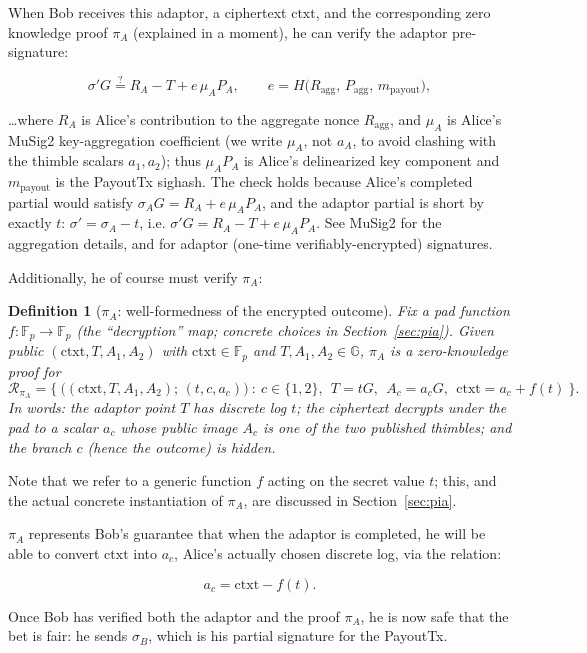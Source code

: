 \documentclass[11pt]{article}
\newtheorem{definition}{Definition}
\begin{document}
When Bob receives this adaptor, a ciphertext $\textrm{ctxt}$, and the corresponding zero knowledge proof $\pi_A$ (explained in a moment), he can verify the adaptor pre-signature:

\[\sigma' G \stackrel{?}{=} R_{A} - T + e\,\mu_A P_A,\qquad e = H\big(R_{\mathrm{agg}},\,P_{\mathrm{agg}},\,m_{\mathrm{payout}}\big),\]

\ldots where $R_{A}$ is Alice's contribution to the aggregate nonce $R_{\mathrm{agg}}$, and $\mu_A$ is Alice's MuSig2 key-aggregation coefficient (we write $\mu_A$, not $a_A$, to avoid clashing with the thimble scalars $a_1,a_2$); thus $\mu_A P_A$ is Alice's delinearized key component and $m_{\mathrm{payout}}$ is the PayoutTx sighash. The check holds because Alice's completed partial would satisfy $\sigma_A G = R_A + e\,\mu_A P_A$, and the adaptor partial is short by exactly $t$: $\sigma' = \sigma_A - t$, i.e. $\sigma'G = R_A - T + e\,\mu_A P_A$. See MuSig2 \cite{musig2,bip327} for the aggregation details, and \cite{fournier} for adaptor (one-time verifiably-encrypted) signatures.

Additionally, he of course must verify $\pi_A$:

\begin{definition}[$\pi_A$: well-formedness of the encrypted outcome]
\label{def:piA}
Fix a pad function $f:\mathbb{F}_p\to\mathbb{F}_p$ (the ``decryption'' map; concrete choices in Section~\ref{sec:pia}). Given public $(\textrm{ctxt},T,A_1,A_2)$ with $\textrm{ctxt}\in\mathbb{F}_p$ and $T,A_1,A_2\in\mathbb{G}$, $\pi_A$ is a zero-knowledge proof for
\[
\mathcal{R}_{\pi_A}=\Big\{\ \big((\textrm{ctxt},T,A_1,A_2);\,(t,c,a_c)\big)\ :\ c\in\{1,2\},\ \ T=tG,\ \ A_c=a_c G,\ \ \textrm{ctxt}=a_c+f(t)\ \Big\}.
\]
In words: the adaptor point $T$ has discrete log $t$; the ciphertext decrypts under the pad to a scalar $a_c$ whose public image $A_c$ is one of the two published thimbles; and the branch $c$ (hence the outcome) is hidden.
\end{definition}

Note that we refer to a generic function $f$ acting on the secret value $t$; this, and the actual concrete instantiation of $\pi_A$, are discussed in Section~\ref{sec:pia}.

$\pi_A$ represents Bob's guarantee that when the adaptor is completed, he will be able to convert $\textrm{ctxt}$ into $a_c$, Alice's actually chosen discrete log, via the relation:

\[a_c = \textrm{ctxt} - f(t).\]

Once Bob has verified both the adaptor and the proof $\pi_A$, he is now safe that the bet is fair: he sends $\sigma_B$, which is his partial signature for the PayoutTx.
\end{document}
